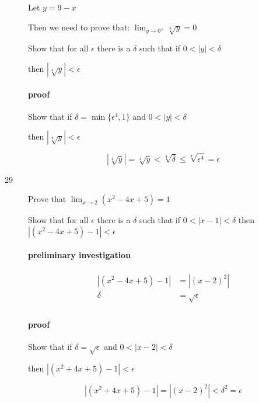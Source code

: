 \documentclass[letterpaper, landscape]{exam}
\begin{document}
\begin{description}
        Let $y = 9 - x$

        Then we need to prove that: $\lim_{y \to 0^+} \sqrt[4]{y} = 0$

        Show that for all $\epsilon$ there is a $\delta$ such that if 
        $0 < |y| < \delta$ 
        
        then $ \left| \sqrt[4]{y} \right| < \epsilon$

        \paragraph{proof}
        Show that if $\delta = \min \{ \epsilon^4, 1 \}$ and 
        $0 < |y| < \delta$ 
        
        then $| \sqrt[4]{y} | < \epsilon$

        \[
          | \sqrt[4]{y} | = \sqrt[4]{y} < \sqrt[4]{\delta} \leq \sqrt[4]{\epsilon^4} = \epsilon
        \]

      \item[29] Prove that $\lim_{x \to 2} \left( x^2 - 4x + 5 \right) = 1$

        Show that for all $\epsilon$ there is a $\delta$ such that if 
        $0 < |x - 1| < \delta$ then $ \left| \left( x^2 - 4x + 5 \right) - 1 \right| < \epsilon$

        \paragraph{preliminary investigation}
        \begin{align*}
          \left| \left( x^2 - 4x + 5 \right) - 1 \right| & = |(x - 2)^2| \\
          \delta                                         & = \sqrt{ \epsilon } \\
        \end{align*}

        \paragraph{proof}
        Show that if $\delta = \sqrt{ \epsilon }$ and 
        $0 < |x - 2| < \delta$ 
        
        then $\left| \left( x^2 + 4x + 5 \right) - 1 \right| < \epsilon$

        \[
          \left| \left( x^2 + 4x + 5 \right) - 1 \right| = |(x - 2)^2| < \delta^2 = \epsilon
        \]

      \newpage


\end{description}
\end{document}
